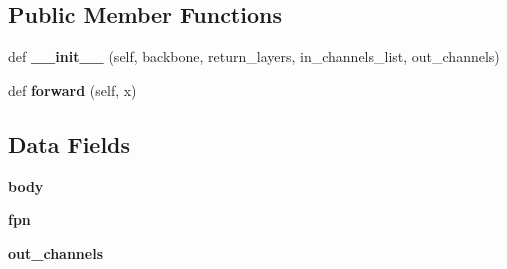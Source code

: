 \subsection*{Public Member Functions}
\begin{DoxyCompactItemize}
\item 
\mbox{\label{classtorchvision_1_1models_1_1detection_1_1backbone__utils_1_1BackboneWithFPN_a15ed5d7a3170ea7bfdbc5f7331ae9a93}} 
def {\bfseries \+\_\+\+\_\+init\+\_\+\+\_\+} (self, backbone, return\+\_\+layers, in\+\_\+channels\+\_\+list, out\+\_\+channels)
\item 
\mbox{\label{classtorchvision_1_1models_1_1detection_1_1backbone__utils_1_1BackboneWithFPN_a61fa7604d615c28e3cca6d888feab3dd}} 
def {\bfseries forward} (self, x)
\end{DoxyCompactItemize}
\subsection*{Data Fields}
\begin{DoxyCompactItemize}
\item 
\mbox{\label{classtorchvision_1_1models_1_1detection_1_1backbone__utils_1_1BackboneWithFPN_ab9ff2b0e9b23909d6220888fb78aced1}} 
{\bfseries body}
\item 
\mbox{\label{classtorchvision_1_1models_1_1detection_1_1backbone__utils_1_1BackboneWithFPN_ad8c27f9174a83bf374a352e5c986be65}} 
{\bfseries fpn}
\item 
\mbox{\label{classtorchvision_1_1models_1_1detection_1_1backbone__utils_1_1BackboneWithFPN_ab2a801040f4464c23f16aa1c2cf0ef7e}} 
{\bfseries out\+\_\+channels}
\end{DoxyCompactItemize}


